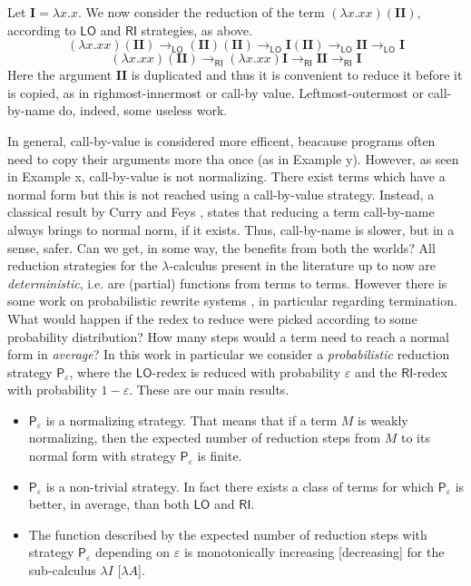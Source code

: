 \documentclass[english]{llncs}
\newcommand{\termone}{M}
\newcommand{\redlo}{\longrightarrow_\pslo}
\newcommand{\redri}{\longrightarrow_\psri}
\newcommand{\pslo}{\mathsf{LO}}
\newcommand{\psri}{\mathsf{RI}}
\begin{document}
\begin{example}
	Let $\bm{I}=\lambda x.x$. We now consider the reduction of the term $(\lambda x.xx)(\bm{II})$, according to $\pslo$ and $\psri$ strategies, as above.
	$$
	(\lambda x.xx)(\bm{II}) \redlo (\bm{II})(\bm{II}) \redlo \bm{I}(\bm{II}) \redlo \bm{II} \redlo \bm{I}
	$$
	$$
	(\lambda x.xx)(\bm{II}) \redri (\lambda x.xx)\bm{I} \redri \bm{II} \redri \bm{I}
	$$
	Here the argument $\bm{II}$ is duplicated and thus it is convenient to reduce it before it is copied, as in righmost-innermost or call-by value. Leftmost-outermost or call-by-name do, indeed, some useless work.
\end{example}
In general, call-by-value is considered more efficent, beacause programs often need to copy their arguments more tha once (as in Example y). However, as seen in Example x, call-by-value is not normalizing. There exist terms which have a normal form but this is not reached using a call-by-value strategy. Instead, a classical result by Curry and Feys \cite{curry_combinatory_1958}, states that reducing a term call-by-name always brings to normal norm, if it exists. Thus, call-by-name is slower, but in a sense, safer. Can we get, in some way, the benefits from both the worlds? 
All reduction strategies for the $\lambda$-calculus present in the literature up to now are \emph{deterministic}, i.e. are (partial) functions from terms to terms. However there is some work on probabilistic rewrite systems \cite{bournez_proving_2005,ferrer_fioriti_probabilistic_2015,avanzini_probabilistic_2018}, in particular regarding termination. What would happen if the redex to reduce were picked according to some probability distribution? How many steps would a term need to reach a normal form in \emph{average}? In this work in particular we consider a \emph{probabilistic} reduction strategy $\mathsf{P}_\varepsilon$, where the $\pslo$-redex is reduced with probability $\varepsilon$ and the $\psri$-redex with probability $1-\varepsilon$. These are our main results.
\begin{itemize}
	\item $\mathsf{P}_\varepsilon$ is a normalizing strategy. That means that if a term $\termone$ is weakly normalizing, then the expected number of reduction steps from $\termone$ to its normal form with strategy $\mathsf{P}_\varepsilon$ is finite.
	\item $\mathsf{P}_\varepsilon$ is a non-trivial strategy. In fact there exists a class of terms for which $\mathsf{P}_\varepsilon$ is better, in average, than both $\pslo$ and $\psri$.
	\item The function described by the expected number of reduction steps with strategy $\mathsf{P}_\varepsilon$ depending on $\varepsilon$ is monotonically increasing [decreasing] for the sub-calculus $\lambda I$ [$\lambda A$].
\end{itemize}


\end{document}
